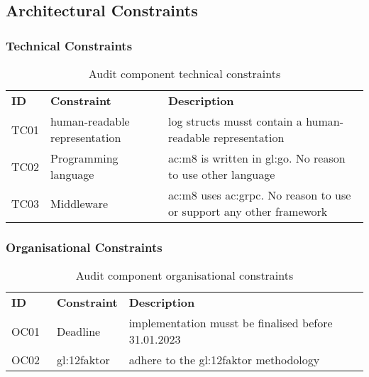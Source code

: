 \subsection{Architectural Constraints}

\subsubsection{Technical Constraints}

\begin{table}[H]
  \begin{center}
    \caption{Audit component technical constraints}
    \label{tab:actc}
    \def\arraystretch{1.5}
    \begin{tabularx}{\linewidth}{|l l X |}
      \hline
      \rowcolor{gray!20}
      \textbf{ID} & \textbf{Constraint} & \textbf{Description}\\
      TC01 & human-readable representation & log structs musst contain a human-readable representation\\
      TC02 & Programming language & \gls{ac:m8} is written in \gls{gl:go}. No reason to use other language\\
      TC03 & Middleware & \gls{ac:m8} uses \gls{ac:grpc}. No reason to use or support any other framework\\
      \hline
    \end{tabularx}
  \end{center}
\end{table}

\subsubsection{Organisational Constraints}

\begin{table}[H]
  \begin{center}
    \caption{Audit component organisational constraints}
    \label{tab:acoc}
    \def\arraystretch{1.5}
    \begin{tabularx}{\linewidth}{|l l X |}
      \hline
      \rowcolor{gray!20}
      \textbf{ID} & \textbf{Constraint} & \textbf{Description}\\
      OC01 & Deadline & implementation musst be finalised before 31.01.2023\\
      OC02~\label{oc:ac02} & \gls{gl:12faktor} & adhere to the \gls{gl:12faktor} methodology\\
      \hline
    \end{tabularx}
  \end{center}
\end{table}

